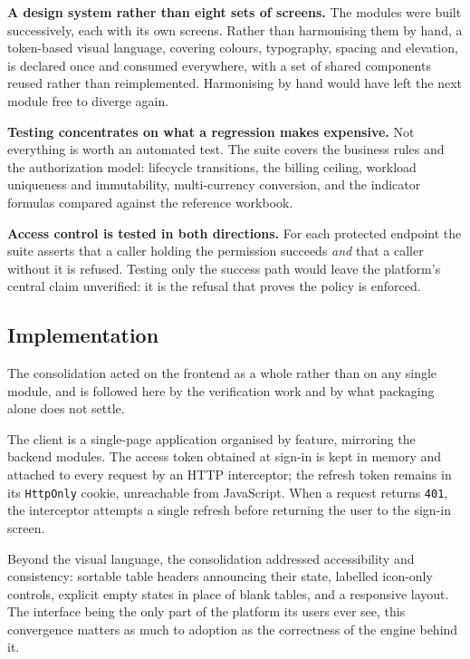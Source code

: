 \textbf{A design system rather than eight sets of screens.} The modules were built successively,
each with its own screens. Rather than harmonising them by hand, a token-based visual language,
covering colours, typography, spacing and elevation, is declared once and consumed everywhere, with
a set of shared components reused rather than reimplemented. Harmonising by hand would have left the
next module free to diverge again.

\textbf{Testing concentrates on what a regression makes expensive.} Not everything is worth an
automated test. The suite covers the business rules and the authorization model: lifecycle
transitions, the billing ceiling, workload uniqueness and immutability, multi-currency conversion,
and the indicator formulas compared against the reference workbook.

\textbf{Access control is tested in both directions.} For each protected endpoint the suite asserts
that a caller holding the permission succeeds \emph{and} that a caller without it is refused.
Testing only the success path would leave the platform's central claim unverified: it is the refusal
that proves the policy is enforced.

\subsection{Implementation}
The consolidation acted on the frontend as a whole rather than on any single module, and is
followed here by the verification work and by what packaging alone does not settle.


The client is a single-page application organised by feature, mirroring the backend modules. The
access token obtained at sign-in is kept in memory and attached to every request by an HTTP
interceptor; the refresh token remains in its \texttt{HttpOnly} cookie, unreachable from JavaScript.
When a request returns \texttt{401}, the interceptor attempts a single refresh before returning the
user to the sign-in screen.

Beyond the visual language, the consolidation addressed accessibility and consistency: sortable
table headers announcing their state, labelled icon-only controls, explicit empty states in place of
blank tables, and a responsive layout. The interface being the only part of the platform its users
ever see, this convergence matters as much to adoption as the correctness of the engine behind it.

